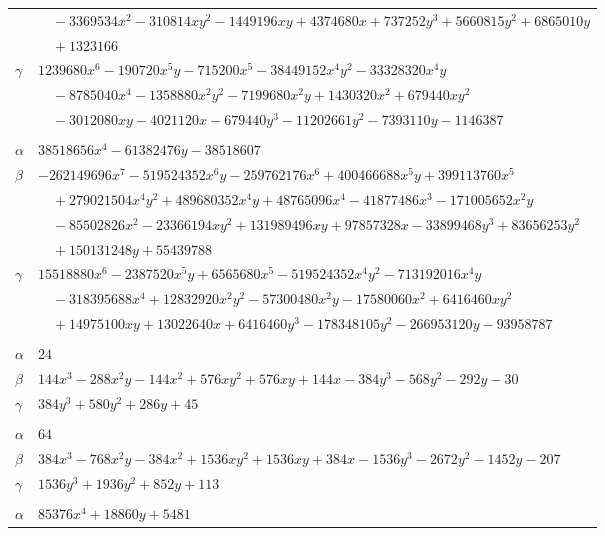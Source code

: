 \documentclass[11pt]{article}
\begin{document}
\begin{longtable}{@{}ll@{}}
 & $\quad -3369534x^{2}-310814xy^{2}-1449196xy+4374680x+737252y^{3}+5660815y^{2}+6865010y$\\
 & $\quad +1323166$\\
$\gamma$ & $1239680x^{6}-190720x^{5}y-715200x^{5}-38449152x^{4}y^{2}-33328320x^{4}y$\\
 & $\quad -8785040x^{4}-1358880x^{2}y^{2}-7199680x^{2}y+1430320x^{2}+679440xy^{2}$\\
 & $\quad -3012080xy-4021120x-679440y^{3}-11202661y^{2}-7393110y-1146387$\\
\addlinespace[3pt]
\multicolumn{2}{@{}l}{$\{i,j\}=\{14,42\}$, $k_{ij}=2^{3}\cdot 7^{2}$}\\
$\alpha$ & $38518656x^{4}-61382476y-38518607$\\
$\beta$ & $-262149696x^{7}-519524352x^{6}y-259762176x^{6}+400466688x^{5}y+399113760x^{5}$\\
 & $\quad +279021504x^{4}y^{2}+489680352x^{4}y+48765096x^{4}-41877486x^{3}-171005652x^{2}y$\\
 & $\quad -85502826x^{2}-23366194xy^{2}+131989496xy+97857328x-33899468y^{3}+83656253y^{2}$\\
 & $\quad +150131248y+55439788$\\
$\gamma$ & $15518880x^{6}-2387520x^{5}y+6565680x^{5}-519524352x^{4}y^{2}-713192016x^{4}y$\\
 & $\quad -318395688x^{4}+12832920x^{2}y^{2}-57300480x^{2}y-17580060x^{2}+6416460xy^{2}$\\
 & $\quad +14975100xy+13022640x+6416460y^{3}-178348105y^{2}-266953120y-93958787$\\
\addlinespace[3pt]
\multicolumn{2}{@{}l}{$\{i,j\}=\{15,16\}$, $k_{ij}=3^{2}$}\\
$\alpha$ & $24$\\
$\beta$ & $144x^{3}-288x^{2}y-144x^{2}+576xy^{2}+576xy+144x-384y^{3}-568y^{2}-292y-30$\\
$\gamma$ & $384y^{3}+580y^{2}+286y+45$\\
\addlinespace[3pt]
\multicolumn{2}{@{}l}{$\{i,j\}=\{15,17\}$, $k_{ij}=3^{2}\cdot 5$}\\
$\alpha$ & $64$\\
$\beta$ & $384x^{3}-768x^{2}y-384x^{2}+1536xy^{2}+1536xy+384x-1536y^{3}-2672y^{2}-1452y-207$\\
$\gamma$ & $1536y^{3}+1936y^{2}+852y+113$\\
\addlinespace[3pt]
\multicolumn{2}{@{}l}{$\{i,j\}=\{15,19\}$, $k_{ij}=2^{2}\cdot 3\cdot 5$}\\
$\alpha$ & $85376x^{4}+18860y+5481$\\

\end{longtable}
\end{document}
